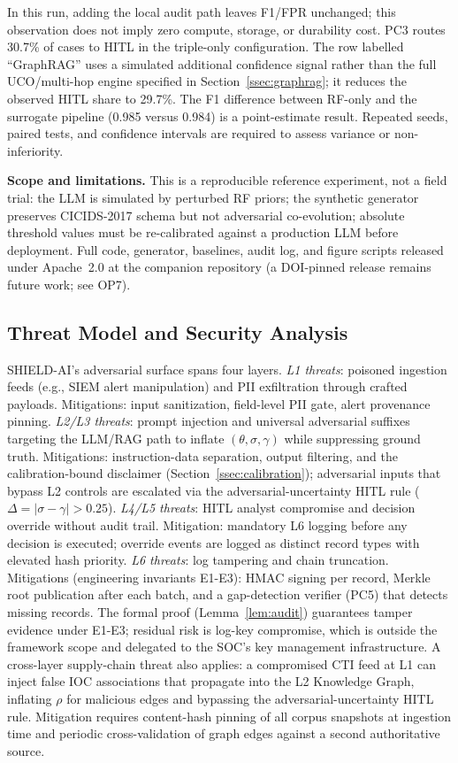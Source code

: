 \documentclass[journal]{IEEEtran}
\begin{document}
In this run, adding the local audit path leaves F1/FPR unchanged; this observation does not
imply zero compute, storage, or durability cost. PC3 routes 30.7\% of cases to HITL in the
triple-only configuration. The row labelled ``GraphRAG'' uses a simulated additional
confidence signal rather than the full UCO/multi-hop engine specified in
Section~\ref{ssec:graphrag}; it reduces the observed HITL share to 29.7\%. The F1 difference
between RF-only and the surrogate pipeline (0.985 versus 0.984) is a point-estimate result.
Repeated seeds, paired tests, and confidence intervals are required to assess variance or
non-inferiority.

\textbf{Scope and limitations.} This is a reproducible reference experiment, not a field
trial: the LLM is simulated by perturbed RF priors; the synthetic generator preserves
CICIDS-2017 schema but not adversarial co-evolution; absolute threshold values must be
re-calibrated against a production LLM before deployment. Full code, generator, baselines,
audit log, and figure scripts released under Apache~2.0 at the companion repository
(a DOI-pinned release remains future work; see OP7).

\subsection{Threat Model and Security Analysis}
\label{ssec:threatmodel}
SHIELD-AI's adversarial surface spans four layers. \emph{L1 threats}: poisoned ingestion
feeds (e.g., SIEM alert manipulation) and PII exfiltration through crafted payloads.
Mitigations: input sanitization, field-level PII gate, alert provenance pinning.
\emph{L2/L3 threats}: prompt injection \cite{greshake2023indirect,liu2024formalizing}
and universal adversarial suffixes \cite{zou2023universal} targeting the LLM/RAG path
to inflate $(\theta, \sigma, \gamma)$ while suppressing ground truth. Mitigations:
instruction-data separation, output filtering, and the calibration-bound disclaimer
(Section~\ref{ssec:calibration}); adversarial inputs that bypass L2 controls are
escalated via the adversarial-uncertainty HITL rule ($\Delta = |\sigma - \gamma| > 0.25$).
\emph{L4/L5 threats}: HITL analyst compromise and decision override without audit trail.
Mitigation: mandatory L6 logging before any decision is executed; override events are
logged as distinct record types with elevated hash priority.
\emph{L6 threats}: log tampering and chain truncation. Mitigations (engineering
invariants E1-E3): HMAC signing per record, Merkle root publication after each batch,
and a gap-detection verifier (PC5) that detects missing records. The formal proof
(Lemma~\ref{lem:audit}) guarantees tamper evidence under E1-E3; residual risk is
log-key compromise, which is outside the framework scope and delegated to the SOC's
key management infrastructure.
A cross-layer supply-chain threat also applies: a compromised CTI feed at L1 can
inject false IOC associations that propagate into the L2 Knowledge Graph, inflating
$\rho$ for malicious edges and bypassing the adversarial-uncertainty HITL rule.
Mitigation requires content-hash pinning of all corpus snapshots at ingestion time
and periodic cross-validation of graph edges against a second authoritative source.
\end{document}
